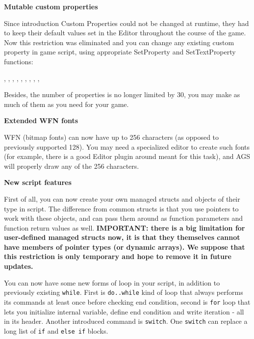 \bf{Mutable custom properties}

Since introduction Custom Properties could not be changed at runtime, they had to keep their
default values set in the Editor throughout the course of the game.
Now this restriction was eliminated and you can change any existing custom property in game
script, using appropriate SetProperty and SetTextProperty functions:

,
,
,
,
,
,
,
,
,

Besides, the number of properties is no longer limited by 30, you may make as much of them as
you need for your game.

\bf{Extended WFN fonts}

WFN (bitmap fonts) can now have up to 256 characters (as opposed to previously supported 128). You
may need a specialized editor to create such fonts (for example, there is a good Editor plugin
around meant for this task), and AGS will properly draw any of the 256 characters.

\bf{New script features}

First of all, you can now create your own managed structs and objects of their type in script. The
difference from common structs is that you use pointers to work with these objects, and can pass them
around as function parameters and function return values as well.
\bf{IMPORTANT:} there is a big limitation for user-defined managed structs now, it is that they themselves
cannot have members of pointer types (or dynamic arrays). We suppose that this restriction is only
temporary and hope to remove it in future updates.

You can now have some new forms of loop in your script, in addition to previously existing \verb$while$.
First is \verb$do..while$ kind of loop that always performs its commands at least once before checking
end condition, second is \verb$for$ loop that lets you initialize internal variable, define end condition
and write iteration - all in its header.
Another introduced command is \verb$switch$. One \verb$switch$ can replace a long list of \verb$if$ and \verb$else if$
blocks.

